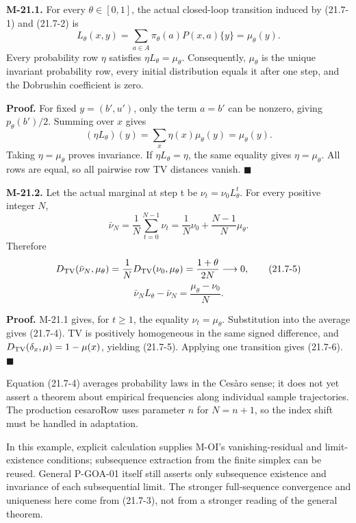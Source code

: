 \documentclass[
  english,
  11pt,
  oneside]{book}
\begin{document}
\hypertarget{m-21-1}{}\label{m-21-1}

\textbf{M-21.1.} For every \(\theta\in[0,1]\), the actual closed-loop transition induced by (21.7-1) and (21.7-2) is \[L_\theta(x,y)
=\sum_{a\in A}\pi_\theta(a)P(x,a)\{y\}
=\mu_\theta(y).                                      \tag{21.7-3}\] Every probability row \(\eta\) satisfies \(\eta L_\theta=\mu_\theta\). Consequently, \(\mu_\theta\) is the unique invariant probability row, every initial distribution equals it after one step, and the Dobrushin coefficient is zero.

\textbf{Proof.} For fixed \(y=(b',u')\), only the term \(a=b'\) can be nonzero, giving \(p_\theta(b')/2\). Summing over \(x\) gives \[(\eta L_\theta)(y)=\sum_x\eta(x)\mu_\theta(y)=\mu_\theta(y).\] Taking \(\eta=\mu_\theta\) proves invariance. If \(\eta L_\theta=\eta\), the same equality gives \(\eta=\mu_\theta\). All rows are equal, so all pairwise row TV distances vanish. \(\blacksquare\)

\hypertarget{m-21-2}{}\label{m-21-2}

\textbf{M-21.2.} Let the actual marginal at step t be \(\nu_t=\nu_0L_\theta^t\). For every positive integer \(N\), \[\bar\nu_N=\frac1N\sum_{t=0}^{N-1}\nu_t
=\frac1N\nu_0+\frac{N-1}{N}\mu_\theta.                \tag{21.7-4}\] Therefore \[D_{\rm TV}(\bar\nu_N,\mu_\theta)
=\frac1N D_{\rm TV}(\nu_0,\mu_\theta)
=\frac{1+\theta}{2N}\longrightarrow0,                \tag{21.7-5}\] \[\bar\nu_NL_\theta-\bar\nu_N
=\frac{\mu_\theta-\nu_0}{N}.                         \tag{21.7-6}\]

\textbf{Proof.} M-21.1 gives, for \(t\ge1\), the equality \(\nu_t=\mu_\theta\). Substitution into the average gives (21.7-4). TV is positively homogeneous in the same signed difference, and \(D_{\rm TV}(\delta_x,\mu)=1-\mu(x)\), yielding (21.7-5). Applying one transition gives (21.7-6). \(\blacksquare\)

Equation (21.7-4) averages probability laws in the Cesàro sense; it does not yet assert a theorem about empirical frequencies along individual sample trajectories. The production cesaroRow uses parameter \(n\) for \(N=n+1\), so the index shift must be handled in adaptation.

In this example, explicit calculation supplies M-OI's vanishing-residual and limit-existence conditions; subsequence extraction from the finite simplex can be reused. General P-GOA-01 itself still asserts only subsequence existence and invariance of each subsequential limit. The stronger full-sequence convergence and uniqueness here come from (21.7-3), not from a stronger reading of the general theorem.
\end{document}
